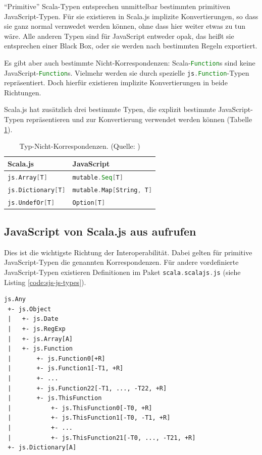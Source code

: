 \documentclass[a4paper, 12pt, hidelinks, listof=totoc, listoftables=totoc, bibliography=totoc]{scrreprt}
\newcommand{\scala}[1]{\lstinline[language=Scala, style=inline]|#1|}
\newcommand{\js}[1]{\lstinline[language=JavaScript, style=inline]|#1|}
\begin{document}
"`Primitive"' Scala-Typen entsprechen unmittelbar bestimmten primitiven JavaScript-Typen. Für sie existieren in Scala.js implizite Konvertierungen, so dass sie ganz normal vernwedet werden können, ohne dass hier weiter etwas zu tun wäre. Alle anderen Typen sind für JavaScript entweder opak, das heißt sie entsprechen einer Black Box, oder sie werden nach bestimmten Regeln exportiert.

Es gibt aber auch bestimmte Nicht-Korrespondenzen: Scala-\scala{Function}s sind keine JavaScript-\js{Function}s. Vielmehr werden sie durch spezielle \scala{js.Function}-Typen repräsentiert. Doch hierfür existieren implizite Konvertierungen in beide Richtungen.

Scala.js hat zusätzlich drei bestimmte Typen, die explizit bestimmte JavaScript-Typen repräsentieren und zur Konvertierung verwendet werden können (Tabelle \ref{table:type-non-correspondance}).

\medskip

\begin{table}[!h]
\begin{tabular}{|l|l|}
\hline \textbf{Scala.js} & \textbf{JavaScript} \\ 
\hline \scala{js.Array[T]}      & \scala{mutable.Seq[T]} \\ 
\hline \scala{js.Dictionary[T]} & \scala{mutable.Map[String, T]} \\ 
\hline \scala{js.UndefOr[T]}    & \scala{Option[T]} \\ 
\hline 
\end{tabular}
\caption{Typ-Nicht-Korrespondenzen. (Quelle: \cite{scalajs.DJI})}
\label{table:type-non-correspondance}
\end{table}

\medskip


\subsection{JavaScript von Scala.js aus aufrufen}

Dies ist die wichtigste Richtung der Interoperabilität. Dabei gelten für primitive JavaScript-Typen die genannten Korrespondenzen. Für andere vordefinierte JavaScript-Typen existieren Definitionen im Paket \scala{scala.scalajs.js} (siehe Listing \ref{code:sjs-js-types}).

\begin{lstlisting}[caption={Scala.js-Typhierarchie für vordefinierte JavaScript-Typen. (Quelle: \cite{scalajs.DCJ})}, label={code:sjs-js-types}]
js.Any
 +- js.Object
 |   +- js.Date
 |   +- js.RegExp
 |   +- js.Array[A]
 |   +- js.Function
 |       +- js.Function0[+R]
 |       +- js.Function1[-T1, +R]
 |       +- ...
 |       +- js.Function22[-T1, ..., -T22, +R]
 |       +- js.ThisFunction
 |           +- js.ThisFunction0[-T0, +R]
 |           +- js.ThisFunction1[-T0, -T1, +R]
 |           +- ...
 |           +- js.ThisFunction21[-T0, ..., -T21, +R]
 +- js.Dictionary[A]
\end{lstlisting}
\end{document}
